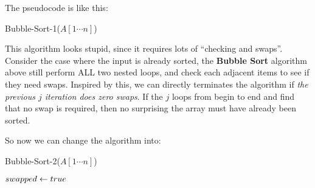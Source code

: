 \begin{spacing}{1.3}
    The pseudocode is like this:
    \begin{algorithm*}[htbp]
        \caption{Bubble-Sort-1($A[1\cdots n]$)}
    \end{algorithm*}

    This algorithm looks stupid, since it requires lots of ``checking and swaps''. Consider the case 
    where the input is already sorted, the {\bf Bubble Sort} algorithm above still 
    perform ALL two nested loops, and check each adjacent items to see if they need swaps.
    Inspired by this, we can directly terminates the algorithm if {\it the previous $j$ iteration 
    does zero swaps}. If the $j$ loops from begin to end and find that no swap is required, then 
    no surprising the array must have already been sorted.
    
    So now we can change the algorithm into:
    \begin{algorithm*}[htbp]
        \caption{Bubble-Sort-2($A[1\cdots n]$)}
        $swapped\leftarrow true$\qquad {}
    \end{algorithm*}


\end{spacing}
